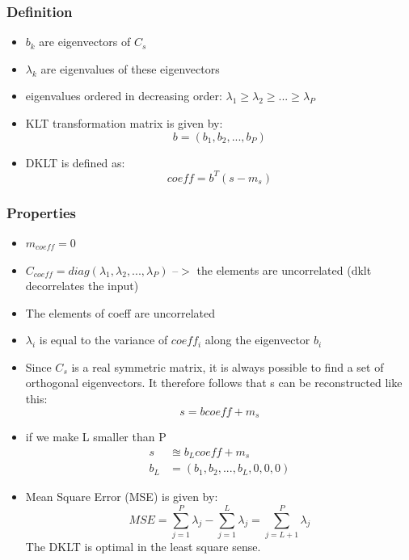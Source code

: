 \documentclass{article}
\begin{document}
\subsubsection{Definition}
\begin{itemize}
    \item $b_k$ are eigenvectors of $C_s$ \\
    \item $\lambda_k$ are eigenvalues of these eigenvectors \\
    \item eigenvalues ordered in decreasing order: $\lambda_1 \geq \lambda_2 \geq ... \geq \lambda_{P}$
    \item KLT transformation matrix is given by: \begin{equation}
        b = (b_1, b_2, ..., b_P)
    \end{equation}
    \item DKLT is defined as: \begin{equation}
        coeff = b^T (s - m_s)
    \end{equation}
\end{itemize}
\subsubsection{Properties}
\begin{itemize}
    \item $m_{coeff} = 0$ 
    \item $C_{coeff} = diag(\lambda_1, \lambda_2, ..., \lambda_P)$ --$>$ the elements are uncorrelated (dklt decorrelates the input)
    \item The elements of coeff are uncorrelated
    \item $\lambda_i$ is equal to the variance of $coeff_i$ along the eigenvector $b_i$
    \item Since $C_s$ is a real symmetric matrix, it is always possible to find
    a set of orthogonal eigenvectors. It therefore follows that s can be reconstructed like this:
    \begin{equation}
        s = b coeff + m_s
    \end{equation}
    \item if we make L smaller than P 
    \begin{equation}
        \begin{split}
        s &\approxeq b_L coeff + m_s \\
        b_L &= (b_1, b_2, ..., b_L, 0, 0, 0)
        \end{split}
    \end{equation}
    \item Mean Square Error (MSE) is given by:
    \begin{equation}
        MSE = \sum_{j=1}^{P}\lambda_j - \sum_{j=1}^{L}\lambda_j = \sum_{j=L+1}^{P}\lambda_j
    \end{equation}
    The DKLT is optimal in the least square sense.
\end{itemize}
\end{document}
